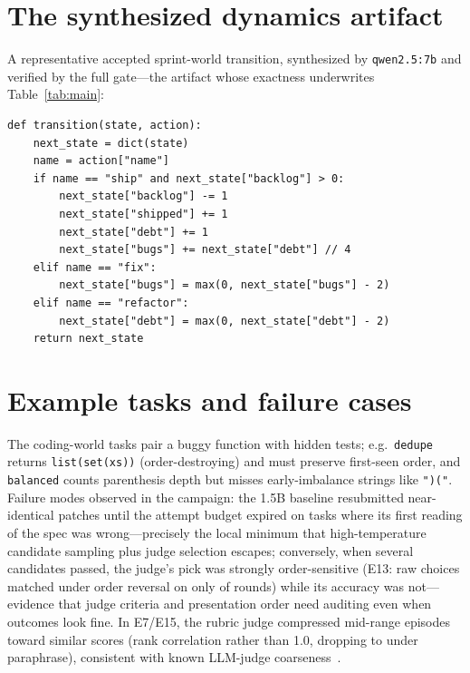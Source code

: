 \documentclass[11pt]{article}
\begin{document}
\section{The synthesized dynamics artifact}\label{app:figs}
A representative accepted sprint-world transition, synthesized by
\texttt{qwen2.5:7b} and verified by the full gate---the artifact whose
exactness underwrites Table~\ref{tab:main}:

\begin{tcolorbox}[policycard, cardcol=cardteal,
  title=Accepted \texttt{transition()} (verbatim)]
\begin{lstlisting}[style=housespecyamlbare]
def transition(state, action):
    next_state = dict(state)
    name = action["name"]
    if name == "ship" and next_state["backlog"] > 0:
        next_state["backlog"] -= 1
        next_state["shipped"] += 1
        next_state["debt"] += 1
        next_state["bugs"] += next_state["debt"] // 4
    elif name == "fix":
        next_state["bugs"] = max(0, next_state["bugs"] - 2)
    elif name == "refactor":
        next_state["debt"] = max(0, next_state["debt"] - 2)
    return next_state
\end{lstlisting}
\end{tcolorbox}

\section{Example tasks and failure cases}\label{app:examples}
The coding-world tasks pair a buggy function with hidden tests; e.g.\
\texttt{dedupe} returns \texttt{list(set(xs))} (order-destroying) and must
preserve first-seen order, and \texttt{balanced} counts parenthesis depth but
misses early-imbalance strings like \texttt{")("}. Failure modes observed in
the campaign: the 1.5B baseline resubmitted near-identical patches until the
attempt budget expired on tasks where its first reading of the spec was
wrong---precisely the local minimum that high-temperature candidate sampling
plus judge selection escapes; conversely, when several candidates passed, the
judge's pick was strongly order-sensitive (E13: raw choices matched under
order reversal on only \OrderConsistency{} of rounds) while its accuracy was
not---evidence that judge criteria and presentation order need auditing even
when outcomes look fine. In E7/E15, the rubric judge compressed mid-range
episodes toward similar scores (rank correlation \JudgeSpearman{} rather than
1.0, dropping to \RubricParaRho{} under paraphrase), consistent with known
LLM-judge coarseness~\cite{llmjudge2023}.
\end{document}
